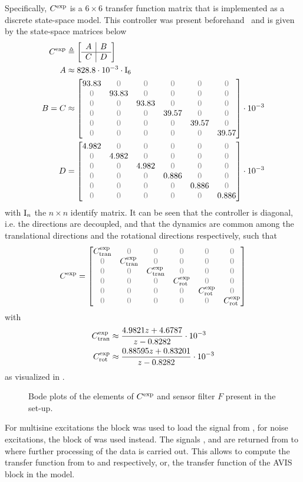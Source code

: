 Specifically, $C^{\mathrm{exp}}$ is a $6\times6$ transfer function matrix that is implemented as a discrete state-space model.
This controller was present beforehand~\citep{Rademakers2005MSc,vanderMaas2011MSc} and is given by the state-space matrices below
\begin{align}
  \experimental\Controller & \isdef \stateSpace{A}{B}{C}{D}\\
  A       &\approx 828.8 \cdot 10^{-3} \cdot \Identity{6} \\
  B = C &\approx \AvisMatrixDiagonal{93.83}{39.57} \cdot 10^{-3}\\
  D       &= \AvisMatrixDiagonal{4.982}{0.886} \cdot 10^{-3}
\end{align}
with $\mathrm{I}_{n}$ the $n\times n$ identify matrix.
It can be seen that the controller is diagonal, i.e. the directions are decoupled, and that the dynamics are common among the translational directions and the rotational directions respectively, such that
\begin{equation}
  \experimental\Controller = 
  \AvisMatrixDiagonal{\experimental\Controller_{\mathrm{tran}}}{\experimental\Controller_{\mathrm{rot}}}
\end{equation}
with
\begin{align}
C^{\mathrm{exp}}_{\mathrm{tran}} &  \approx 
   \frac{4.9821 z + 4.6787}{ z - 0.8282} \cdot 10^{-3} \\
  C^{\mathrm{exp}}_{\mathrm{rot}} & \approx 
    \frac{0.88595 z + 0.83201}{ z - 0.8282} \cdot 10^{-3}
\end{align}
 as visualized in .

\begin{figure}
\setlength{}
\setlength\figureheight{0.68\figurewidth}

\caption{Bode plots of the elements of $C^{\mathrm{exp}}$ and sensor filter $F$ present in the set-up.}
\label{fig:avis:bodeplots:controllerAndSensor}
\end{figure}

For multisine excitations the  block was used to load the  signal from \MATLAB, for noise excitations, the  block of \Simulink was used instead.
The signals ,  and  are returned from \Simulink to \MATLAB where further processing of the data is carried out.
This allows to compute the transfer function from  to  and  respectively, or, the transfer function of the \gls{AVIS} block in the \Simulink model.

